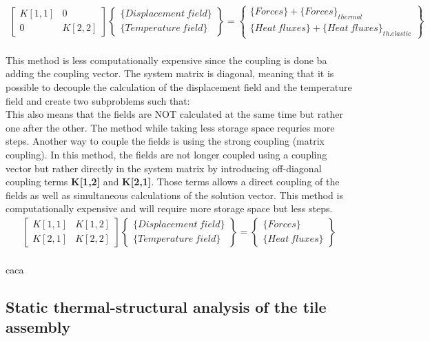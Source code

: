\begin{gather}
    \begin{bmatrix} K[1,1] & 0 \\ 0 & K[2,2] \end{bmatrix}
    \begin{Bmatrix} \{Displacement \ field\} \\ \{Temperature \ field\} \end{Bmatrix}
    =
    \begin{Bmatrix} \{Forces\}+\{Forces\}_{thermal} \\ \{Heat \ fluxes\}+\{Heat \ fluxes\}_{th. elastic} \end{Bmatrix}
    \label{eq:coupling}
\end{gather}
\\
\normalsize{\indent This method is less computationally expensive since the coupling is done ba adding the coupling vector. The system matrix is diagonal, meaning that it is possible to decouple the calculation of the displacement field and the temperature field and create two subproblems such that:}
\\
\normalsize{\indent This also means that the fields are NOT calculated at the same time but rather one after the other. The method while taking less storage space requries more steps. Another way to couple the fields is using the strong coupling (matrix coupling). In this method, the fields are not longer coupled using a coupling vector but rather directly in the system matrix by introducing off-diagonal coupling terms {\bfseries K[1,2]} and {\bfseries K[2,1]}. Those terms allows a direct coupling of the fields as well as simultaneous calculations of the solution vector. This method is computationally expensive and will require more storage space but less steps.}
\\
\begin{gather}
    \begin{bmatrix} K[1,1] & K[1,2] \\ K[2,1] & K[2,2] \end{bmatrix}
    \begin{Bmatrix} \{Displacement \ field\} \\ \{Temperature \ field\} \end{Bmatrix}
    =
    \begin{Bmatrix} \{Forces\} \\ \{Heat \ fluxes\} \end{Bmatrix}
    \label{eq:coupling3}
\end{gather}
\\
caca
\subsection{Static thermal-structural analysis of the tile assembly}